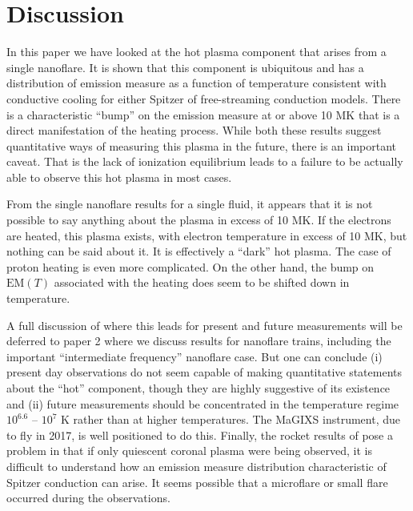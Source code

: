 \documentclass[apj]{emulateapj}
\begin{document}
	\section{Discussion}
	\label{sec:discussion}
	\par In this paper we have looked at the hot plasma component that arises from a single nanoflare. It is shown that this component is ubiquitous and has a distribution of emission measure as a function of temperature consistent with conductive cooling for either Spitzer of free-streaming conduction models. There is a characteristic ``bump'' on the emission measure at or above 10 MK that is a direct manifestation of the heating process. While both these results suggest quantitative ways of measuring this plasma in the future, there is an important caveat. That is the lack of ionization equilibrium leads to a failure to be actually able to observe this hot plasma in most cases.
	\par From the single nanoflare results for a single fluid, it appears that it is not possible to say anything about the plasma in excess of 10 MK. If the electrons are heated, this plasma exists, with electron temperature in excess of 10 MK, but nothing can be said about it. It is effectively a ``dark'' hot plasma. The case of proton heating is even more complicated. On the other hand, the bump on $\mathrm{EM}(T)$ associated with the heating does seem to be shifted down in temperature.
	\par A full discussion of where this leads for present and future measurements will be deferred to paper 2 where we discuss results for nanoflare trains, including the important ``intermediate frequency'' nanoflare case. But one can conclude (i) present day observations do not seem capable of making quantitative statements about the ``hot'' component, though they are highly suggestive of its existence and (ii) future measurements should be concentrated in the temperature regime $10^{6.6}$ – $10^7$ K rather than at higher temperatures. The MaGIXS instrument, due to fly in 2017, is well positioned to do this. Finally, the rocket results of \citet{caspi_new_2015} pose a problem in that if only quiescent coronal plasma were being observed, it is difficult to understand how an emission measure distribution characteristic of Spitzer conduction can arise. It seems possible that a microflare or small flare occurred during the observations.
	\appendix
\end{document}
